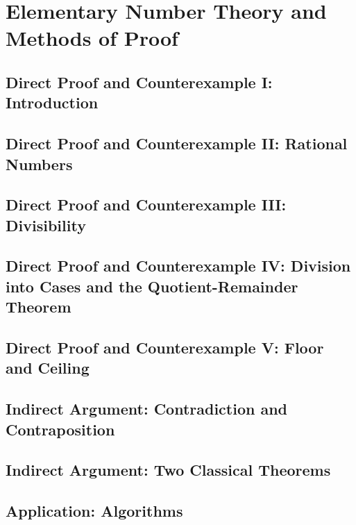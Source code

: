 \section{Elementary Number Theory and Methods of Proof}
\subsection{Direct Proof and Counterexample I: Introduction}
\subsection{Direct Proof and Counterexample II: Rational Numbers}
\subsection{Direct Proof and Counterexample III: Divisibility}
\subsection{Direct Proof and Counterexample IV: Division into Cases and the Quotient-Remainder Theorem}
\subsection{Direct Proof and Counterexample V: Floor and Ceiling}
\subsection{Indirect Argument: Contradiction and Contraposition}
\subsection{Indirect Argument: Two Classical Theorems}
\subsection{Application: Algorithms}